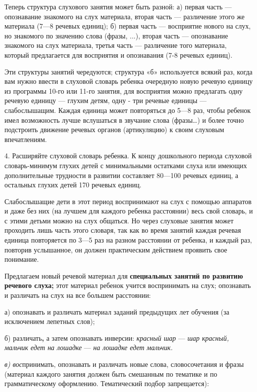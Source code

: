 \documentclass{book}
\renewcommand{\emph}[1]{\textit{#1}}
\begin{document}
Теперь структура слухового занятия может быть разной: а) первая часть
--- опознавание знакомого на слух материала, вторая часть --- различение
этого же материала (7---8 речевых единиц); б) первая часть ---
восприятие нового на слух, но знакомого по значению слова (фразы, ...),
вторая часть --- опознавание знакомого на слух материала, третья часть
--- различение того материала, который предлагается для восприятия и
опознавания (7-8 речевых единиц).

Эти структуры занятий чередуются; структура «б» используется всякий раз,
когда вам нужно ввести в слуховой словарь ребенка очередную новую
речевую единицу из программы 10-го или 11-го занятия, для восприятия
можно предлагать одну речевую единицу --- глухим детям, одну - три
речевые единицы --- слабослышащим. Каждая единица может повторяться до
5---8 раз, чтобы ребенок имел возможность лучше вслушаться в звучание
слова (фразы\ldots) и более точно подстроить движение речевых органов
(артикуляцию) к своим слуховым впечатлениям.

4. Расширяйте слуховой словарь ребенка. К концу дошкольного периода
слуховой словарь-минимум глухих детей с минимальными остатками слуха или
имеющих дополнительные трудности в развитии составляет 80---100 речевых
единиц, а остальных глухих детей 170 речевых единиц.

Слабослышащие дети в этот период воспринимают на слух с помощью
аппаратов и даже без них (на лучшем для каждого ребенка расстоянии) весь
свой словарь, и с этими детьми можно на слух общаться. Но через слуховые
занятия может проходить лишь часть этого словаря, так как во время
занятий каждая речевая единица повторяется по 3---5 раз на разном
расстоянии от ребенка, и каждый раз, повторив услышанное, он должен
практическим действием проявить свое понимание.

Предлагаем новый речевой материал для \textbf{специальных занятий по
развитию речевого слуха;} этот материал ребенок учится воспринимать на
слух; опознавать и различать на слух на все большем расстоянии:

а) опознавать и различать материал заданий предыдущих лет обучения (за
исключением лепетных слов);

б) различать\textbf{,} а затем опознавать инверсии: \emph{красный шар}
--- \emph{шар красный, мальчик едет на лошадке} --- \emph{на лошадке
едет мальчик.}

\emph{в) вос}принимать, опознавать и различать новые слова,
словосочетания и фразы (материал каждого занятия должен быть смешанным
по тематике и по грамматическому оформлению. Тематический подбор
запрещается):
\end{document}
